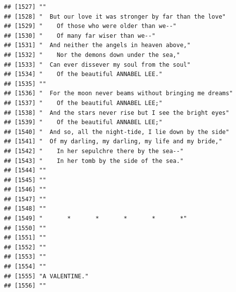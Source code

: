 \documentclass{article}\usepackage[]{graphicx}\usepackage[]{color}
\makeatletter
\newenvironment{kframe}{%
 \def\at@end@of@kframe{}%
 \ifinner\ifhmode%
  \def\at@end@of@kframe{\end{minipage}}%
  \begin{minipage}{\columnwidth}%
 \fi\fi%
 \def\FrameCommand##1{\hskip\@totalleftmargin \hskip-\fboxsep
 \colorbox{shadecolor}{##1}\hskip-\fboxsep
     \hskip-\linewidth \hskip-\@totalleftmargin \hskip\columnwidth}%
 \MakeFramed {\advance\hsize-\width
   \@totalleftmargin\z@ \linewidth\hsize
   \@setminipage}}%
 {\par\unskip\endMakeFramed%
 \at@end@of@kframe}
\newenvironment{knitrout}{}{} %
\makeatother
\begin{document}
\begin{knitrout}
\begin{kframe}
\begin{verbatim}
## [1527] ""                                                                            
## [1528] "  But our love it was stronger by far than the love"                         
## [1529] "    Of those who were older than we--"                                       
## [1530] "    Of many far wiser than we--"                                             
## [1531] "  And neither the angels in heaven above,"                                   
## [1532] "    Nor the demons down under the sea,"                                      
## [1533] "  Can ever dissever my soul from the soul"                                   
## [1534] "    Of the beautiful ANNABEL LEE."                                           
## [1535] ""                                                                            
## [1536] "  For the moon never beams without bringing me dreams"                       
## [1537] "    Of the beautiful ANNABEL LEE;"                                           
## [1538] "  And the stars never rise but I see the bright eyes"                        
## [1539] "    Of the beautiful ANNABEL LEE;"                                           
## [1540] "  And so, all the night-tide, I lie down by the side"                        
## [1541] "  Of my darling, my darling, my life and my bride,"                          
## [1542] "    In her sepulchre there by the sea--"                                     
## [1543] "    In her tomb by the side of the sea."                                     
## [1544] ""                                                                            
## [1545] ""                                                                            
## [1546] ""                                                                            
## [1547] ""                                                                            
## [1548] ""                                                                            
## [1549] "       *       *       *       *       *"                                    
## [1550] ""                                                                            
## [1551] ""                                                                            
## [1552] ""                                                                            
## [1553] ""                                                                            
## [1554] ""                                                                            
## [1555] "A VALENTINE."                                                                
## [1556] ""                                                                            

\end{verbatim}
\end{kframe}
\end{knitrout}
\end{document}
